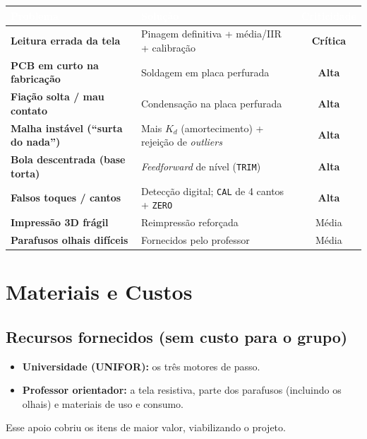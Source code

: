 \documentclass[11pt,a4paper,oneside]{article}
\newcommand{\rowstyle}{\rowcolor{rowgray}}
\begin{document}
\begin{center}
\small
\renewcommand{\arraystretch}{1.25}
\begin{tabularx}{\textwidth}{>{\bfseries}p{5.2cm} >{\RaggedRight\arraybackslash}X c}
\toprule
\rowcolor{primary}
\textcolor{white}{Problema} & \textcolor{white}{Solução} & \textcolor{white}{Criticidade} \\
\midrule
Leitura errada da tela & Pinagem definitiva + média/IIR + calibração & \textcolor{danger}{\textbf{Crítica}} \\
\rowstyle PCB em curto na fabricação & Soldagem em placa perfurada & \textbf{Alta} \\
Fiação solta / mau contato & Condensação na placa perfurada & \textbf{Alta} \\
\rowstyle Malha instável (``surta do nada'') & Mais $K_d$ (amortecimento) + rejeição de \emph{outliers} & \textbf{Alta} \\
Bola descentrada (base torta) & \emph{Feedforward} de nível (\texttt{TRIM}) & \textbf{Alta} \\
\rowstyle Falsos toques / cantos & Detecção digital; \texttt{CAL} de 4 cantos + \texttt{ZERO} & \textbf{Alta} \\
Impressão 3D frágil & Reimpressão reforçada & Média \\
\rowstyle Parafusos olhais difíceis & Fornecidos pelo professor & Média \\
\bottomrule
\end{tabularx}
\end{center}

\section{Materiais e Custos}

\subsection{Recursos fornecidos (sem custo para o grupo)}

\begin{infobox}
\begin{itemize}
  \item \textbf{Universidade (UNIFOR):} os três motores de passo.
  \item \textbf{Professor orientador:} a tela resistiva, parte dos parafusos
  (incluindo os olhais) e materiais de uso e consumo.
\end{itemize}
Esse apoio cobriu os itens de maior valor, viabilizando o projeto.
\end{infobox}
\end{document}
